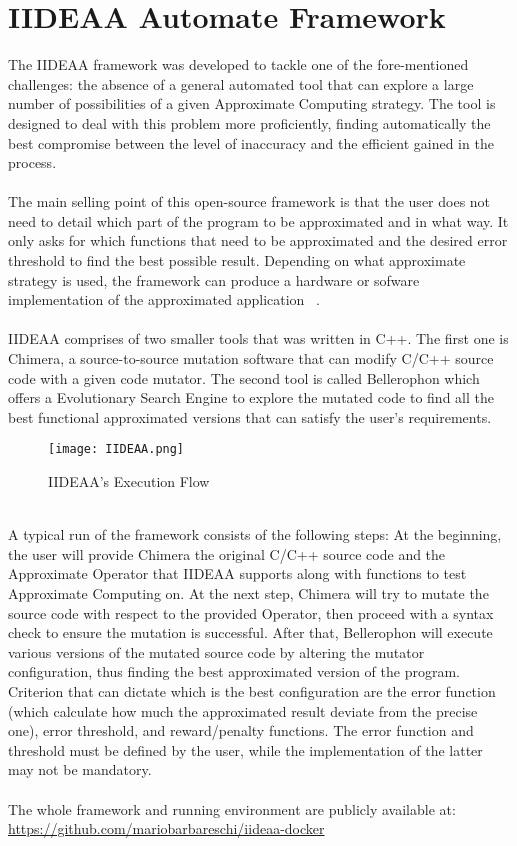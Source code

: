 \section{IIDEAA Automate Framework} 

The IIDEAA framework was developed to tackle one of the fore-mentioned challenges: the absence of a general automated tool that can explore a large number of possibilities of a given Approximate Computing strategy. The tool is designed to deal with this problem more proficiently, finding automatically the best compromise between the level of inaccuracy and the efficient gained in the process. \\
~\\
The main selling point of this open-source framework is that the user does not need to detail which part of the program to be approximated and in what way. It only asks for which functions that need to be approximated and the desired error threshold to find the best possible result. Depending on what approximate strategy is used, the framework can produce a hardware or sofware implementation of the approximated application ~\cite{iideaa}. \\
~\\
IIDEAA comprises of two smaller tools that was written in C++. The first one is Chimera, a source-to-source mutation software that can modify C/C++ source code with a given code mutator. The second tool is called Bellerophon which offers a Evolutionary Search Engine to explore the mutated code to find all the best functional approximated versions that can satisfy the user's requirements. \\
\newpage
\begin{figure}[H]
\texttt{[image: IIDEAA.png]}
\centering
\caption{IIDEAA's Execution Flow}
\end{figure}
~\\
A typical run of the framework consists of the following steps: At the beginning, the user will provide Chimera the original C/C++ source code  and the Approximate Operator that IIDEAA supports along with functions to test Approximate Computing on. At the next step, Chimera will try to mutate the source code with respect to the provided Operator, then proceed with a syntax check to ensure the mutation is successful. After that, Bellerophon will execute various versions of the mutated source code by altering the mutator configuration, thus finding the best approximated version of the program. Criterion that can dictate which is the best configuration are the error function (which calculate how much the approximated result deviate from the precise one), error threshold, and reward/penalty functions. The error function and threshold must be defined by the user, while the implementation of the latter may not be mandatory. \\
~\\
The whole framework and running environment are publicly available at: \url{https://github.com/mariobarbareschi/iideaa-docker}

